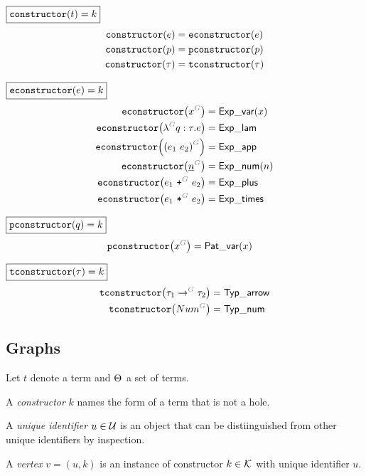 \noindent $\boxed{\operatorname{\texttt{constructor}}\mathopen{}\left(t\right)\mathclose{} = k}$
%
\begin{align*}
  \operatorname{\texttt{constructor}}\mathopen{}\left(e\right)\mathclose{} &= \operatorname{\texttt{econstructor}}\mathopen{}\left(e\right)\mathclose{} \\
  \operatorname{\texttt{constructor}}\mathopen{}\left(p\right)\mathclose{} &= \operatorname{\texttt{pconstructor}}\mathopen{}\left(p\right)\mathclose{} \\
  \operatorname{\texttt{constructor}}\mathopen{}\left(\tau\right)\mathclose{} &= \operatorname{\texttt{tconstructor}}\mathopen{}\left(\tau\right)\mathclose{}
\end{align*}

\noindent $\boxed{\operatorname{\texttt{econstructor}}\mathopen{}\left(e\right)\mathclose{} = k}$
%
\begin{align*}
  \econstructor{\eVar{G}{x}} &= \ExpVar(x) \\
  \econstructor{\eFun{G}{q}{\tau}{e}} &= \ExpLam \\
  \econstructor{\eApp{G}{e_1}{e_2}} &= \ExpApp \\
  \econstructor{\eNum{G}{n}} &= \ExpNum(n) \\
  \econstructor{\ePlus{G}{e_1}{e_2}} &= \ExpPlus \\
  \econstructor{\eTimes{G}{e_1}{e_2}} &= \ExpTimes
\end{align*}

\noindent $\boxed{\operatorname{\texttt{pconstructor}}\mathopen{}\left(q\right)\mathclose{} = k}$
%
\begin{align*}
  \pconstructor{\pVar{G}{x}} &= \PatVar(x)
\end{align*}

\noindent $\boxed{\operatorname{\texttt{tconstructor}}\mathopen{}\left(\tau\right)\mathclose{} = k}$
%
\begin{align*}
  \tconstructor{\tArrow{G}{\tau_1}{\tau_2}} &= \TypArrow \\
  \tconstructor{\tNum{G}} &= \TypNum
\end{align*}


\subsection{Graphs}

Let $t$ denote a term and $\Theta_{}$ a set of terms.

\begin{definition}
  A \emph{constructor} $k$ names the form of a term that is not a hole.
\end{definition}

\begin{definition}
  A \emph{unique identifier} $u \in \mathcal{U}$ is an object that can be distiinguished from other unique identifiers by inspection.
\end{definition}

\begin{definition}
  A \emph{vertex} $v{=}(u, k)$ is an instance of constructor $k \in \mathcal{K}$ with unique identifier $u$.
\end{definition}

